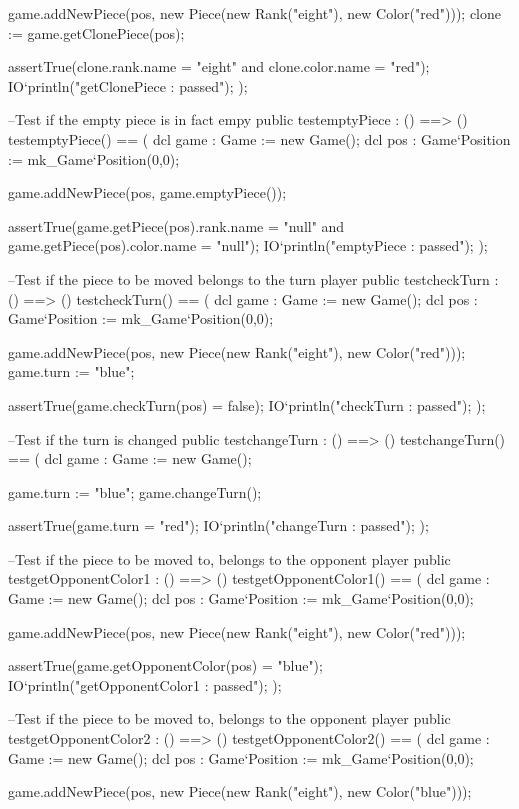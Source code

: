 \begin{vdm_al}
    game.addNewPiece(pos, new Piece(new Rank("eight"), new Color("red")));
    clone := game.getClonePiece(pos);
    
    assertTrue(clone.rank.name = "eight" and clone.color.name = "red");
    IO`println("getClonePiece : passed");
   );
  
  --Test if the empty piece is in fact empy
  public testemptyPiece : () ==> ()
   testemptyPiece() ==
   (
    dcl game : Game := new Game();
    dcl pos : Game`Position := mk_Game`Position(0,0);
    
    game.addNewPiece(pos, game.emptyPiece());
    
    assertTrue(game.getPiece(pos).rank.name = "null" and game.getPiece(pos).color.name = "null");
    IO`println("emptyPiece : passed");
   );
  
  --Test if the piece to be moved belongs to the turn player
  public testcheckTurn : () ==> ()
   testcheckTurn() ==
   (
    dcl game : Game := new Game();
    dcl pos : Game`Position := mk_Game`Position(0,0);
    
    game.addNewPiece(pos, new Piece(new Rank("eight"), new Color("red")));
    game.turn := "blue";
    
    assertTrue(game.checkTurn(pos) = false);
    IO`println("checkTurn : passed");
   );
  
  --Test if the turn is changed
  public testchangeTurn : () ==> ()
   testchangeTurn() ==
   (
    dcl game : Game := new Game();
    
    game.turn := "blue";
    game.changeTurn();
    
    assertTrue(game.turn = "red");
    IO`println("changeTurn : passed");
   );
  
  --Test if the piece to be moved to, belongs to the opponent player
  public testgetOpponentColor1 : () ==> ()
   testgetOpponentColor1() ==
   (
    dcl game : Game := new Game();
    dcl pos : Game`Position := mk_Game`Position(0,0);
    
    game.addNewPiece(pos, new Piece(new Rank("eight"), new Color("red")));
    
    assertTrue(game.getOpponentColor(pos) = "blue");
    IO`println("getOpponentColor1 : passed");
   );
   
  --Test if the piece to be moved to, belongs to the opponent player
  public testgetOpponentColor2 : () ==> ()
   testgetOpponentColor2() ==
   (
    dcl game : Game := new Game();
    dcl pos : Game`Position := mk_Game`Position(0,0);
    
    game.addNewPiece(pos, new Piece(new Rank("eight"), new Color("blue")));
    

\end{vdm_al}
